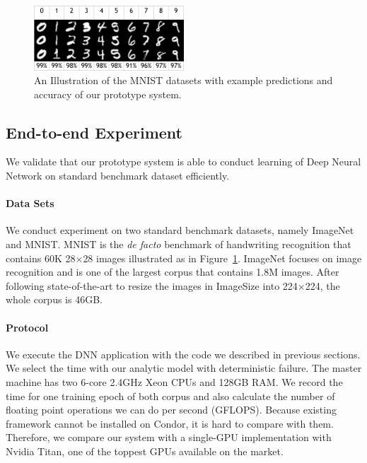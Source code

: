 \documentclass[11pt]{article}
\begin{document}
\begin{figure}[t]
\centering
\includegraphics[width=0.5\textwidth]{figures/result-crop}
\caption{An Illustration of the MNIST datasets with
example predictions and accuracy of our prototype system.}
\label{fig:mnist}
\end{figure}


\subsection{End-to-end Experiment}

We validate that our prototype system is able to conduct
learning of Deep Neural Network on standard benchmark dataset
efficiently.

\paragraph*{Data Sets} We conduct experiment on two standard
benchmark datasets, namely ImageNet and MNIST. MNIST is the
{\em de facto} benchmark of handwriting recognition that contains
60K 28$\times$28 images illustrated as in Figure~\ref{fig:mnist}. ImageNet
focuses on image recognition and is one of the largest corpus
that contains 1.8M images. After following state-of-the-art to
resize the images in ImageSize into 224$\times$224, the whole
corpus is 46GB.

\paragraph*{Protocol} We execute the DNN application with the
code we described in previous sections. We select the time with
our analytic model with deterministic failure. The master
machine has two 6-core 2.4GHz Xeon CPUs and 128GB RAM.
We record the time for one training epoch of both corpus
and also calculate the number of floating point operations
we can do per second (GFLOPS). Because existing framework
cannot be installed on Condor, it is hard to compare with them.
Therefore, we compare our system with a single-GPU implementation
with Nvidia Titan, one of the toppest GPUs available on the market.
\end{document}
